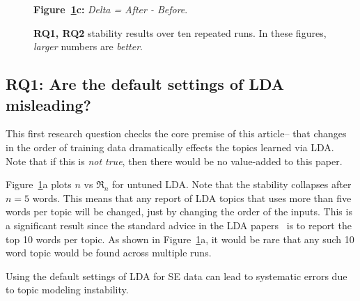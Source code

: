 \documentclass[10pt,conference]{IEEEtran}
\theoremstyle{break}
\begin{document}
\begin{figure}[!t]
\begin{center}
  {\bf Figure~\ref{fig:delta}c:}  {\em Delta = After - Before}. 
  
\end{center}
  \caption{{\bf RQ1, RQ2} stability results over ten repeated runs. In these figures, {\em larger} numbers
    are {\em better}.}\label{fig:delta}
\end{figure}
\subsection{\textbf{RQ1: Are the default settings of LDA misleading?}}


This first research question checks the core premise of this article-- that changes
in the order of training data dramatically effects the topics learned via LDA.
Note that if this is {\em not true}, then there would be no value-added to this paper.


Figure~\ref{fig:delta}a   plots $n$ vs $\Re_n$ for untuned  LDA.
Note that the  stability collapses after $n=5$ words. This means
  that any report of LDA topics that uses more than five words per topic will
  be changed, just by changing the order of the inputs. This is a significant result
  since the standard advice in the LDA papers~\cite{panichella2013effectively, lukins2010bug}
  is to report the top 10 words per topic. As shown in Figure~\ref{fig:delta}a, it would
  be rare that any such 10 word topic would be found across multiple runs.
  
 
\begin{lesson}
  Using the default settings of LDA for SE data can lead to systematic errors due to topic
  modeling instability. 
\end{lesson}
\end{document}
